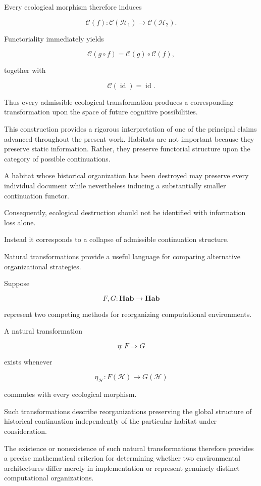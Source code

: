 \documentclass[12pt,oneside]{article}
\theoremstyle{remark}
\begin{document}
Every ecological morphism therefore induces

\[
\mathcal{C}(f)
:
\mathcal{C}(\mathcal H_1)
\rightarrow
\mathcal{C}(\mathcal H_2).
\]

Functoriality immediately yields

\[
\mathcal C(g\circ f)
=
\mathcal C(g)
\circ
\mathcal C(f),
\]

together with

\[
\mathcal C(\operatorname{id})
=
\operatorname{id}.
\]

Thus every admissible ecological transformation produces a corresponding
transformation upon the space of future cognitive possibilities.

This construction provides a rigorous interpretation of one of the principal
claims advanced throughout the present work. Habitats are not important because
they preserve static information. Rather, they preserve functorial structure
upon the category of possible continuations.

A habitat whose historical organization has been destroyed may preserve every
individual document while nevertheless inducing a substantially smaller
continuation functor.

Consequently, ecological destruction should not be identified with information
loss alone.

Instead it corresponds to a collapse of admissible continuation structure.

Natural transformations provide a useful language for comparing alternative
organizational strategies.

Suppose

\[
F,G
:
\mathbf{Hab}
\rightarrow
\mathbf{Hab}
\]

represent two competing methods for reorganizing computational environments.

A natural transformation

\[
\eta
:
F
\Rightarrow
G
\]

exists whenever

\[
\eta_{\mathcal H}
:
F(\mathcal H)
\rightarrow
G(\mathcal H)
\]

commutes with every ecological morphism.

Such transformations describe reorganizations preserving the global structure of
historical continuation independently of the particular habitat under
consideration.

The existence or nonexistence of such natural transformations therefore provides
a precise mathematical criterion for determining whether two environmental
architectures differ merely in implementation or represent genuinely distinct
computational organizations.
\end{document}
